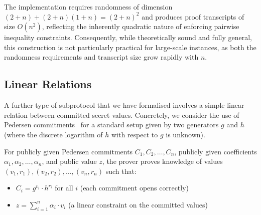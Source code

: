 \documentclass[sigconf,anonymous,review]{acmart}
\begin{document}
The implementation \texttt{} requires randomness of dimension \((2+n) + (2+n)(1+n) = (2+n)^2\) and produces proof transcripts of size \(O(n^2)\), reflecting the inherently quadratic nature of enforcing pairwise inequality constraints. Consequently, while theoretically sound and fully general, this construction is not particularly practical for large-scale instances, as both the randomness requirements and transcript size grow rapidly with \(n\).



\subsection{Linear Relations}
A further type of subprotocol that we have formalised involves a simple linear relation between committed secret values.
Concretely, we consider the use of Pedersen commitments~\cite{pedersen1991non} for a standard setup given by two generators $g$ 
and $h$ (where the discrete logarithm of $h$ with respect to $g$ is unknown). 

For publicly given Pedersen commitments $C_1, C_2, \ldots, C_n$, publicly given coefficients $\alpha_1, \alpha_2, \ldots, \alpha_n$,
and public value $z$, the prover proves knowledge of values $(v_1, r_1), (v_2, r_2), \ldots, (v_n, r_n)$ such that:
\begin{itemize}
\item $C_i = g^{v_i} \cdot h^{r_i}$ for all $i$ (each commitment opens correctly)
\item $z = \sum_{i=1}^{n} \alpha_i \cdot v_i$ (a linear constraint on the committed values)
\end{itemize}
\end{document}

